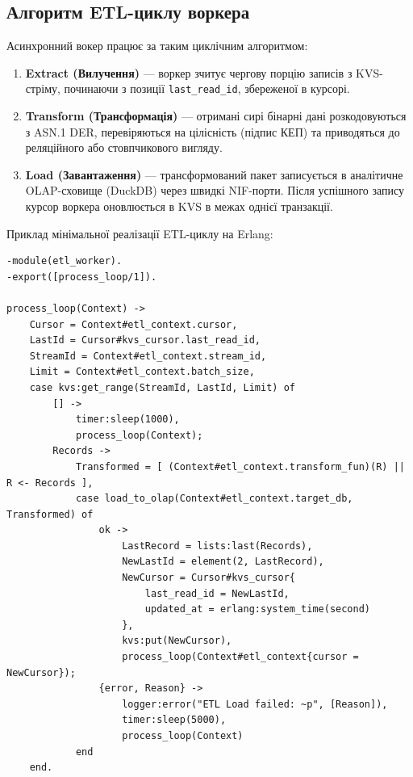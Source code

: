 \documentclass{article}
\begin{document}
\subsection{Алгоритм ETL-циклу воркера}
Асинхронний вокер працює за таким циклічним алгоритмом:
\begin{enumerate}
    \item \textbf{Extract (Вилучення)} --- воркер зчитує чергову порцію записів з KVS-стріму, починаючи з позиції \texttt{last\_read\_id}, збереженої в курсорі.
    \item \textbf{Transform (Трансформація)} --- отримані сирі бінарні дані розкодовуються з ASN.1 DER, перевіряються на цілісність (підпис КЕП) та приводяться до реляційного або стовпчикового вигляду.
    \item \textbf{Load (Завантаження)} --- трансформований пакет записується в аналітичне OLAP-сховище (DuckDB) через швидкі NIF-порти. Після успішного запису курсор воркера оновлюється в KVS в межах однієї транзакції.
\end{enumerate}

Приклад мінімальної реалізації ETL-циклу на Erlang:
\begin{lstlisting}
-module(etl_worker).
-export([process_loop/1]).

process_loop(Context) ->
    Cursor = Context#etl_context.cursor,
    LastId = Cursor#kvs_cursor.last_read_id,
    StreamId = Context#etl_context.stream_id,
    Limit = Context#etl_context.batch_size,
    case kvs:get_range(StreamId, LastId, Limit) of
        [] ->
            timer:sleep(1000),
            process_loop(Context);
        Records ->
            Transformed = [ (Context#etl_context.transform_fun)(R) || R <- Records ],            
            case load_to_olap(Context#etl_context.target_db, Transformed) of
                ok ->
                    LastRecord = lists:last(Records),
                    NewLastId = element(2, LastRecord),                    
                    NewCursor = Cursor#kvs_cursor{
                        last_read_id = NewLastId,
                        updated_at = erlang:system_time(second)
                    },                    
                    kvs:put(NewCursor),                    
                    process_loop(Context#etl_context{cursor = NewCursor});
                {error, Reason} ->
                    logger:error("ETL Load failed: ~p", [Reason]),
                    timer:sleep(5000),
                    process_loop(Context)
            end
    end.
\end{lstlisting}
\end{document}
